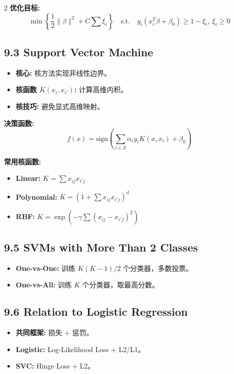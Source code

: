\documentclass[6pt,a4paper]{ctexart}
\begin{document}
\begin{multicols}{2}
\textbf{优化目标:}
$$ \min \left\{ \frac{1}{2} \|\beta\|^{2} + C \sum \xi_{i} \right\} \quad \text{s.t.} \quad y_{i}(x_{i}^{T}\beta + \beta_{0}) \ge 1 - \xi_{i}, \ \xi_{i} \ge 0 $$

\subsection*{9.3 Support Vector Machine}
\begin{itemize}
    \item \textbf{核心:} 核方法实现非线性边界。
    \item \textbf{核函数 $K(x_i, x_{i'})$:} 计算高维内积。
    \item \textbf{核技巧:} 避免显式高维映射。
\end{itemize}

\textbf{决策函数:}
$$ f(x) = \text{sign}\left( \sum_{i \in \mathcal{S}} \alpha_{i} y_{i} K(x, x_{i}) + \beta_{0} \right) $$

\textbf{常用核函数:}
\begin{itemize}
    \item \textbf{Linear:} $ K = \sum x_{ij} x_{i'j} $
    \item \textbf{Polynomial:} $ K = (1 + \sum x_{ij} x_{i'j})^{d} $
    \item \textbf{RBF:} $ K = \exp(-\gamma \sum (x_{ij} - x_{i'j})^{2}) $
\end{itemize}

\subsection*{9.5 SVMs with More Than 2 Classes}
\begin{itemize}
    \item \textbf{One-vs-One:} 训练 $K(K-1)/2$ 个分类器，多数投票。
    \item \textbf{One-vs-All:} 训练 $K$ 个分类器，取最高分数。
\end{itemize}

\subsection*{9.6 Relation to Logistic Regression}
\begin{itemize}
    \item \textbf{共同框架:} 损失 + 惩罚。
    \item \textbf{Logistic:} Log-Likelihood Loss + L2/L1。
    \item \textbf{SVC:} Hinge Loss + L2。
\end{itemize}


\end{multicols}
\end{document}

